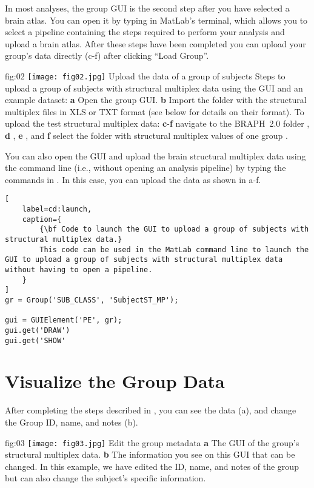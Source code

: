 \documentclass[justified]{tufte-handout}
\begin{document}
In most analyses, the group GUI is the second step after you have selected a brain atlas. You can open it by typing  in MatLab's terminal, which allows you to select a pipeline containing the steps required to perform your analysis and upload a brain atlas. After these steps have been completed you can upload your group's data directly (c-f) after clicking ``Load Group''. 

	{fig:02}
	{
	\texttt{[image: fig02.jpg]}
	}
	{Upload the data of a group of subjects}
	{
	Steps to upload a group of subjects with structural multiplex data using the GUI and an example dataset: 
	{\bf a} Open the group GUI.
	{\bf b} Import the folder with the structural multiplex files in XLS or TXT format (see below for details on their format).
	To upload the test structural multiplex data:
	{\bf c}-{\bf f} navigate to the BRAPH~2.0 folder , {\bf d} ,  {\bf e} , and {\bf f} select the folder with structural multiplex values of one group .
	}

\begin{tcolorbox}[
	title=GUI launch from command line
]
You can also open the GUI and upload the brain structural multiplex data using the command line (i.e., without opening an analysis pipeline) by typing the commands in . In this case, you can upload the data as shown in a-f.
%
\begin{lstlisting}[
	label=cd:launch,
	caption={
		{\bf Code to launch the GUI to upload a group of subjects with structural multiplex data.}
		This code can be used in the MatLab command line to launch the GUI to upload a group of subjects with structural multiplex data without having to open a pipeline.
	}
]
gr = Group('SUB_CLASS', 'SubjectST_MP');

gui = GUIElement('PE', gr);
gui.get('DRAW')
gui.get('SHOW'
\end{lstlisting}
\end{tcolorbox}

\section{Visualize the Group Data}

After completing the steps described in , you can see the data (a), and change the Group ID, name, and notes (b). 

	{fig:03}
	{
	\texttt{[image: fig03.jpg]}
	}
	{Edit the group metadata}
	{ 
	{\bf a} The GUI of the group's structural multiplex data. 
	{\bf b} The information you see on this GUI that can be changed. In this example, we have edited the ID, name, and notes of the group but can also change the subject's specific information.
	}
\end{document}
